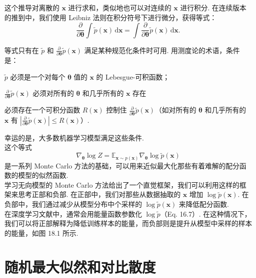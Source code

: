 这个推导对离散的 $\pmb{x}$ 进行求和，类似地也可以对连续的 $\pmb{x}$ 进行积分. 在连续版本的推到中，我们使用 Leibniz 法则在积分符号下进行微分，获得等式：
\begin{equation}  \label{eq:pyth}
\frac{\partial}{\partial \pmb{\theta}} \int \!\tilde{p}(\mathbf{x}) \, \mathrm{d}\pmb{x} = \int \!\frac{\partial}{\partial \pmb{\theta}} \tilde{p}(\pmb{x}) \,\mathrm{d}\pmb{x}.
\end{equation}

等式只有在 $\tilde{p}$ 和 $\frac{\partial}{\partial \pmb{\theta}} \tilde{p}(\mathbf{x})$ 满足某种规范化条件时可用. 用测度论的术语，条件是：
\begin{enumerate*}[label={\roman*)}]
\item $\tilde{p}$ 必须是一个对每个 $\pmb{\theta}$ 值的 $\pmb{x}$ 的 Lebesgue-可积函数；
\item $\frac{\partial}{\partial \pmb{\theta}} \tilde{p}(\mathbf{x})$ 必须对所有的 $\pmb{\theta}$ 和几乎所有的 $\pmb{x}$ 存在
\item 必须存在一个可积分函数 $R(\pmb{x})$ 控制住 $\frac{\partial}{\partial \pmb{\theta}} \tilde{p}(\mathbf{x})$（如对所有的 $\pmb{\theta}$ 和几乎所有的 $\pmb{x}$ 有 $|\frac{\partial}{\partial \pmb{\theta}}\tilde{p}(\mathbf{x})|\leq R(\pmb{x})$）.
\end{enumerate*}

幸运的是，大多数机器学习模型满足这些条件.\\

这个等式
\begin{equation}  \label{eq:pyth15}
\nabla_{\pmb{\theta}} \log Z = \mathbb{E}_{\mathbf{x}\sim p(\mathbf{x})} \nabla_{\pmb{\theta}} \log \tilde{p}(\mathbf{x})
\end{equation}
是一系列 Monte Carlo 方法的基础，可以用来近似最大化那些有着难解的配分函数的模型的似然函数.\\

学习无向模型的 Monte Carlo 方法给出了一个直觉框架，我们可以利用这样的框架来思考正部和负部. 在正部中，我们对那些从数据抽取的 $\pmb{x}$ 增加 $\log \tilde{p}(\mathbf{x})$. 在负部中，我们通过减少从模型分布中个采样的 $\log \tilde{p}(\mathbf{x})$ 来降低配分函数.\\

在深度学习文献中，通常会用能量函数参数化 $\log \tilde{p}$（Eq. 16.7）. 在这种情况下，我们可以将正部解释为降低训练样本的能量，而负部则是提升从模型中采样的样本的能量，如图 18.1 所示.

\section{随机最大似然和对比散度}

